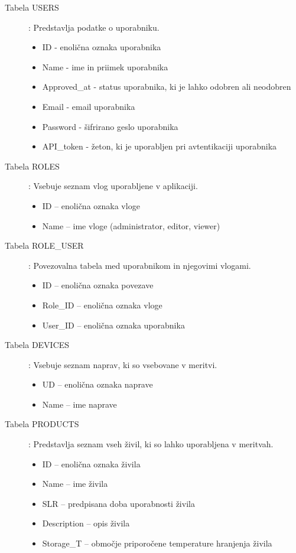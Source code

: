 \documentclass[a4paper, 12pt]{book}
\begin{document}
\begin{description}
\item[Tabela USERS] : Predstavlja podatke o uporabniku.
	\begin{itemize}
		\item ID - enolična oznaka uporabnika
		\item Name - ime in priimek uporabnika
		\item Approved\_at - status uporabnika, ki je lahko odobren ali neodobren
		\item Email - email uporabnika
		\item Password - šifrirano geslo uporabnika
		\item API\_token - žeton, ki je uporabljen pri avtentikaciji uporabnika
	\end{itemize}	

\item[Tabela ROLES] : Vsebuje seznam vlog uporabljene v aplikaciji.
	\begin{itemize}
		\item ID – enolična oznaka vloge
		\item Name – ime vloge (administrator, editor, viewer)
	\end{itemize}

\item[Tabela ROLE\_USER] : Povezovalna tabela med uporabnikom in njegovimi vlogami. 
	\begin{itemize}
		\item ID – enolična oznaka povezave
		\item Role\_ID – enolična oznaka vloge
		\item User\_ID – enolična oznaka uporabnika
	\end{itemize}

\item[Tabela DEVICES] : Vsebuje seznam naprav, ki so vsebovane v meritvi.
	\begin{itemize}
		\item UD – enolična oznaka naprave
		\item Name – ime naprave
	\end{itemize}

\item[Tabela PRODUCTS] : Predstavlja seznam vseh živil, ki so lahko uporabljena v meritvah.
	\begin{itemize}		
		\item ID – enolična oznaka živila
		\item Name – ime živila
		\item SLR – predpisana doba uporabnosti živila
		\item Description – opis živila
		\item Storage\_T – območje priporočene temperature hranjenja živila
	\end{itemize}
	

\end{description}
\end{document}
